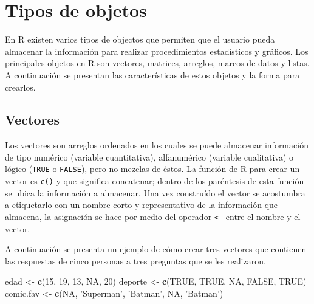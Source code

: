 \documentclass[10pt,]{krantz}
\makeatletter
\newenvironment{Shaded}{\begin{snugshade}}{\end{snugshade}}
\newcommand{\KeywordTok}[1]{\textcolor[rgb]{0.13,0.29,0.53}{\textbf{{#1}}}}
\newcommand{\DecValTok}[1]{\textcolor[rgb]{0.00,0.00,0.81}{{#1}}}
\newcommand{\StringTok}[1]{\textcolor[rgb]{0.31,0.60,0.02}{{#1}}}
\newcommand{\OtherTok}[1]{\textcolor[rgb]{0.56,0.35,0.01}{{#1}}}
\newcommand{\NormalTok}[1]{{#1}}
\let\proglang=\textsf
\newenvironment{kframe}{%
\medskip{}
\setlength{\fboxsep}{.8em}
 \def\at@end@of@kframe{}%
 \ifinner\ifhmode%
  \def\at@end@of@kframe{\end{minipage}}%
  \begin{minipage}{\columnwidth}%
 \fi\fi%
 \def\FrameCommand##1{\hskip\@totalleftmargin \hskip-\fboxsep
 \colorbox{shadecolor}{##1}\hskip-\fboxsep
     \hskip-\linewidth \hskip-\@totalleftmargin \hskip\columnwidth}%
 \MakeFramed {\advance\hsize-\width
   \@totalleftmargin\z@ \linewidth\hsize
   \@setminipage}}%
 {\par\unskip\endMakeFramed%
 \at@end@of@kframe}
\renewenvironment{Shaded}{\begin{kframe}}{\end{kframe}}
\makeatother
\begin{document}
\section{Tipos de objetos} \label{sec:objetos}

En \proglang{R} existen varios tipos de objectos  que
permiten que el usuario pueda almacenar la información para realizar
procedimientos estadísticos y gráficos. Los principales objetos en
\proglang{R} son vectores, matrices, arreglos, marcos de datos y listas.
A continuación se presentan las características de estos objetos y la
forma para crearlos.

\subsection{Vectores}

Los vectores  son arreglos ordenados en los cuales se
puede almacenar información de tipo numérico (variable cuantitativa),
alfanumérico (variable cualitativa) o lógico (\texttt{TRUE} o
\texttt{FALSE}), pero no mezclas de éstos. La función de \proglang{R}
para crear un vector es \texttt{c()} y que significa concatenar; dentro
de los paréntesis de esta función se ubica la información a almacenar.
Una vez construído el vector se acostumbra a etiquetarlo con un nombre
corto y representativo de la información que almacena, la asignación se
hace por medio del operador \texttt{\textless{}-} entre el nombre y el
vector.

A continuación se presenta un ejemplo de cómo crear tres vectores que
contienen las respuestas de cinco personas a tres preguntas que se les
realizaron.

\begin{Shaded}
\begin{Highlighting}[]
\NormalTok{edad <-}\StringTok{ }\KeywordTok{c}\NormalTok{(}\DecValTok{15}\NormalTok{, }\DecValTok{19}\NormalTok{, }\DecValTok{13}\NormalTok{, }\OtherTok{NA}\NormalTok{, }\DecValTok{20}\NormalTok{)}
\NormalTok{deporte <-}\StringTok{ }\KeywordTok{c}\NormalTok{(}\OtherTok{TRUE}\NormalTok{, }\OtherTok{TRUE}\NormalTok{, }\OtherTok{NA}\NormalTok{, }\OtherTok{FALSE}\NormalTok{, }\OtherTok{TRUE}\NormalTok{)}
\NormalTok{comic.fav <-}\StringTok{ }\KeywordTok{c}\NormalTok{(}\OtherTok{NA}\NormalTok{, }\StringTok{'Superman'}\NormalTok{, }\StringTok{'Batman'}\NormalTok{, }\OtherTok{NA}\NormalTok{, }\StringTok{'Batman'}\NormalTok{)}
\end{Highlighting}
\end{Shaded}
\end{document}
